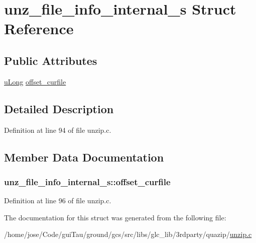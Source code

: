 \hypertarget{structunz__file__info__internal__s}{\section{unz\-\_\-file\-\_\-info\-\_\-internal\-\_\-s Struct Reference}
\label{structunz__file__info__internal__s}
}
\subsection*{Public Attributes}
\begin{DoxyCompactItemize}
\item 
\hyperlink{zconf_8h_a154b3b80120c903a368fec5f11f3007a}{u\-Long} \hyperlink{structunz__file__info__internal__s_a23d3a1c3584888bdf066d7bfed95f62e}{offset\-\_\-curfile}
\end{DoxyCompactItemize}


\subsection{Detailed Description}


Definition at line 94 of file unzip.\-c.



\subsection{Member Data Documentation}
\hypertarget{structunz__file__info__internal__s_a23d3a1c3584888bdf066d7bfed95f62e}{
\subsubsection[{offset\-\_\-curfile}]{ unz\-\_\-file\-\_\-info\-\_\-internal\-\_\-s\-::offset\-\_\-curfile}}\label{structunz__file__info__internal__s_a23d3a1c3584888bdf066d7bfed95f62e}


Definition at line 96 of file unzip.\-c.



The documentation for this struct was generated from the following file\-:\begin{DoxyCompactItemize}
\item 
/home/jose/\-Code/gui\-Tau/ground/gcs/src/libs/glc\-\_\-lib/3rdparty/quazip/\hyperlink{unzip_8c}{unzip.\-c}\end{DoxyCompactItemize}

